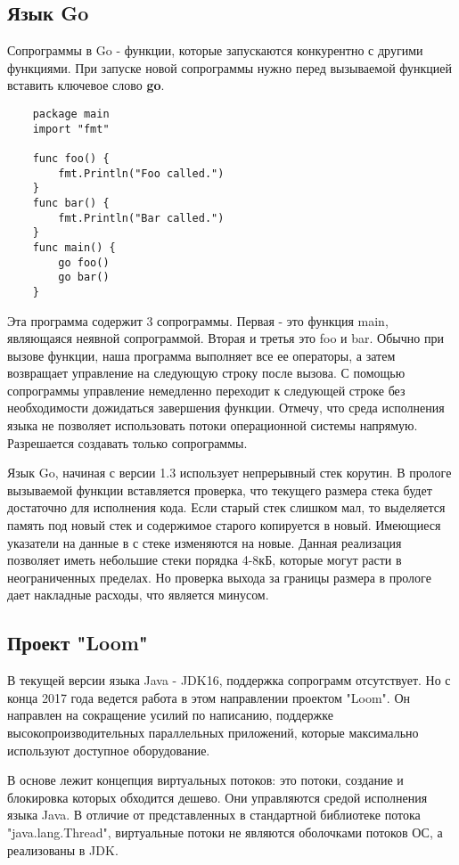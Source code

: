 	\subsection{Язык Go}
	Сопрограммы в Go - функции, которые запускаются конкурентно с другими функциями. 
	При запуске новой сопрограммы нужно перед вызываемой функцией вставить ключевое слово \textbf{go}.
	
	\begin{lstlisting}
	package main
	import "fmt"
	
	func foo() {
		fmt.Println("Foo called.")
	}
	func bar() {
		fmt.Println("Bar called.")
	}
	func main() {
		go foo()
		go bar()
	}

	\end{lstlisting}
		
	Эта программа содержит 3 сопрограммы. Первая - это функция main, являющаяся
	неявной сопрограммой. Вторая и третья это foo и bar. Обычно при вызове функции, наша программа 
	выполняет все ее операторы, а затем возвращает управление на следующую строку после вызова. 
	С помощью сопрограммы управление немедленно переходит к следующей строке без необходимости дожидаться завершения функции.
	Отмечу, что среда исполнения языка не позволяет использовать потоки операционной системы
	напрямую. Разрешается создавать только сопрограммы.
	\par
	Язык Go, начиная с версии 1.3 использует непрерывный стек корутин. В прологе вызываемой функции вставляется проверка,
	что текущего размера стека будет достаточно для исполнения кода. Если старый стек слишком мал,
	то выделяется память под новый стек и содержимое старого копируется в новый. Имеющиеся указатели на
	данные в с стеке изменяются на новые. Данная реализация позволяет иметь небольшие стеки порядка 4-8кБ, которые
	могут расти в неограниченных пределах. Но проверка выхода за границы размера в прологе дает накладные расходы,
	что является минусом.
	
	\subsection{Проект "Loom"}
	В текущей версии языка Java - JDK16, поддержка сопрограмм отсутствует. Но с конца 2017 года ведется 
	работа в этом направлении проектом "Loom". Он направлен на сокращение усилий по написанию, поддержке
	высокопроизводительных параллельных приложений, которые максимально используют доступное оборудование.
	\par
	В основе лежит концепция виртуальных потоков: это потоки, создание и блокировка которых обходится
	дешево. Они управляются средой исполнения языка Java. В отличие от представленных в стандартной
	библиотеке потока "java.lang.Thread", виртуальные потоки не являются оболочками потоков ОС, а
	реализованы в JDK.
	
